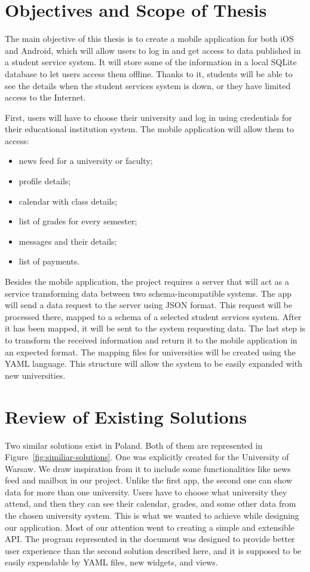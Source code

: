 \section{Objectives and Scope of Thesis}


The main objective of this thesis is to create a mobile application for both iOS and Android, which will allow users to log in and get access to data published in a student service system. It will store some of the information in a local SQLite database to let users access them offline. Thanks to it, students will be able to see the details when the student services system is down, or they have limited access to the Internet.

First, users will have to choose their university and log in using credentials for their educational institution system. The mobile application will allow them to access:
\begin{itemize}
    \item news feed for a university or faculty;
    \item profile details;
    \item calendar with class details;
    \item list of grades for every semester;
    \item messages and their details;
    \item list of payments.
\end{itemize}

Besides the mobile application, the project requires a server that will act as a service transforming data between two schema-incompatible systems. The app will send a data request to the server using JSON format. This request will be processed there, mapped to a schema of a selected student services system. After it has been mapped, it will be sent to the system requesting data. The last step is to transform the received information and return it to the mobile application in an expected format. The mapping files for universities will be created using the YAML language. This structure will allow the system to be easily expanded with new universities.

\section{Review of Existing Solutions}

Two similar solutions exist in Poland. Both of them are represented in Figure~\ref{fig:similiar-solutions}. One was explicitly created for the University of Warsaw. We draw inspiration from it to include some functionalities like news feed and mailbox in our project. Unlike the first app, the second one can show data for more than one university. Users have to choose what university they attend, and then they can see their calendar, grades, and some other data from the chosen university system. This is what we wanted to achieve while designing our application. Most of our attention went to creating a simple and extensible API. The program represented in the document was designed to provide better user experience than the second solution described here, and it is supposed to be easily expendable by YAML files, new widgets, and views.

